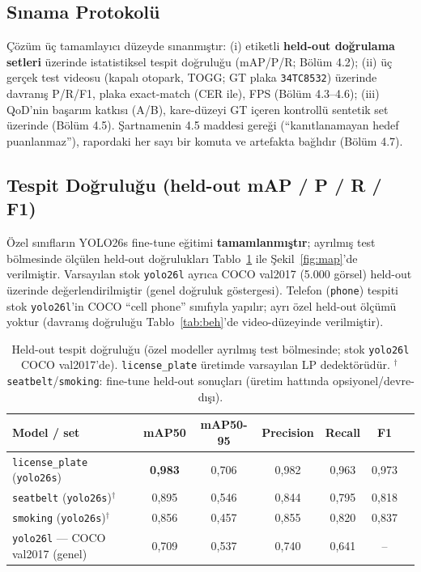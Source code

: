 \documentclass[12pt,a4paper]{article}
\newcommand{\tcode}[1]{\texttt{\small #1}}
\begin{document}
\subsection{Sınama Protokolü}
Çözüm üç tamamlayıcı düzeyde sınanmıştır: (i) etiketli \textbf{held-out doğrulama setleri} üzerinde
istatistiksel tespit doğruluğu (mAP/P/R; Bölüm 4.2); (ii) üç gerçek test videosu (kapalı otopark, TOGG;
GT plaka \tcode{34TC8532}) üzerinde davranış P/R/F1, plaka exact-match (CER ile), FPS (Bölüm 4.3--4.6);
(iii) QoD'nin başarım katkısı (A/B), kare-düzeyi GT içeren kontrollü sentetik set üzerinde (Bölüm 4.5).
Şartnamenin 4.5 maddesi gereği (``kanıtlanamayan hedef puanlanmaz''), rapordaki her sayı bir komuta ve
artefakta bağlıdır (Bölüm 4.7).

\subsection{Tespit Doğruluğu (held-out mAP / P / R / F1)}
Özel sınıfların YOLO26s fine-tune eğitimi \textbf{tamamlanmıştır}; ayrılmış test bölmesinde ölçülen
held-out doğrulukları Tablo~\ref{tab:map} ile Şekil~\ref{fig:map}'de verilmiştir.
Varsayılan stok \tcode{yolo26l} ayrıca COCO val2017 (5.000 görsel) held-out üzerinde değerlendirilmiştir
(genel doğruluk göstergesi). Telefon (\tcode{phone}) tespiti stok \tcode{yolo26l}'in COCO ``cell phone''
sınıfıyla yapılır; ayrı özel held-out ölçümü yoktur (davranış doğruluğu Tablo~\ref{tab:beh}'de
video-düzeyinde verilmiştir).

\begin{table}[H]\centering\small
\caption{Held-out tespit doğruluğu (özel modeller ayrılmış test bölmesinde; stok \tcode{yolo26l} COCO val2017'de). \tcode{license\_plate} üretimde varsayılan LP dedektörüdür. $^{\dagger}$\,\tcode{seatbelt}/\tcode{smoking}: fine-tune held-out sonuçları (üretim hattında opsiyonel/devre-dışı).}\label{tab:map}
\begin{tabularx}{\textwidth}{>{\raggedright\arraybackslash}X cccccc}
\toprule
\textbf{Model / set} & \textbf{mAP50} & \textbf{mAP50-95} & \textbf{Precision} & \textbf{Recall} & \textbf{F1} \\ \midrule
\tcode{license\_plate} (\tcode{yolo26s}) & \textbf{0,983} & 0,706 & 0,982 & 0,963 & 0,973 \\
\tcode{seatbelt} (\tcode{yolo26s})$^{\dagger}$ & 0,895 & 0,546 & 0,844 & 0,795 & 0,818 \\
\tcode{smoking} (\tcode{yolo26s})$^{\dagger}$ & 0,856 & 0,457 & 0,855 & 0,820 & 0,837 \\
\tcode{yolo26l} — COCO val2017 (genel) & 0,709 & 0,537 & 0,740 & 0,641 & -- \\
\bottomrule
\end{tabularx}
\end{table}
\end{document}
